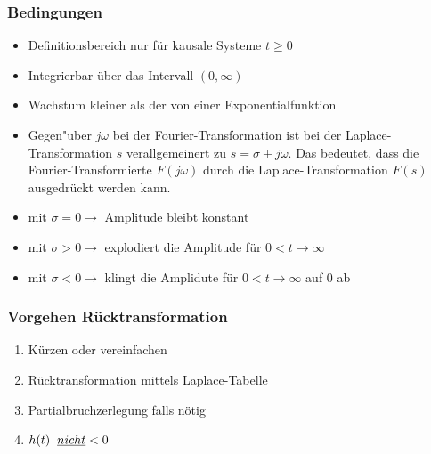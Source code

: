 \begin{multicols}{2}
\begin{center}
\subsubsection{Bedingungen}
\begin{itemize}
		\item Definitionsbereich nur für kausale Systeme $t\geq 0$\\
		\item Integrierbar über das Intervall $(0,\infty)$\\
		\item Wachstum kleiner als der von einer Exponentialfunktion\\ 
		\item Gegen"uber $j\omega$ bei der Fourier-Transformation ist bei der
			Laplace-Transformation $s$ verallgemeinert zu $s=\sigma + j\omega$. Das
			bedeutet, dass die Fourier-Transformierte $F(j\omega)$ durch die
			Laplace-Transformation $F(s)$ ausgedr\"uckt werden kann. \\
		\item mit $\sigma = 0 \rightarrow$ Amplitude bleibt konstant\\
		\item mit $\sigma > 0 \rightarrow$ explodiert die Amplitude f\"ur $0 < t \rightarrow \infty$ \\
		\item mit $\sigma < 0 \rightarrow$ klingt die Amplidute für $0 < t \rightarrow \infty$ auf $0$ ab
\end{itemize}

	\subsubsection{Vorgehen Rücktransformation}
		\begin{enumerate}
			\item Kürzen oder vereinfachen
			\item Rücktransformation mittels Laplace-Tabelle
			\item Partialbruchzerlegung falls nötig
			\item $h(t)\hspace{0.2cm}\underline{nicht} < 0$
		\end{enumerate}
	\end{center}
\end{multicols}

